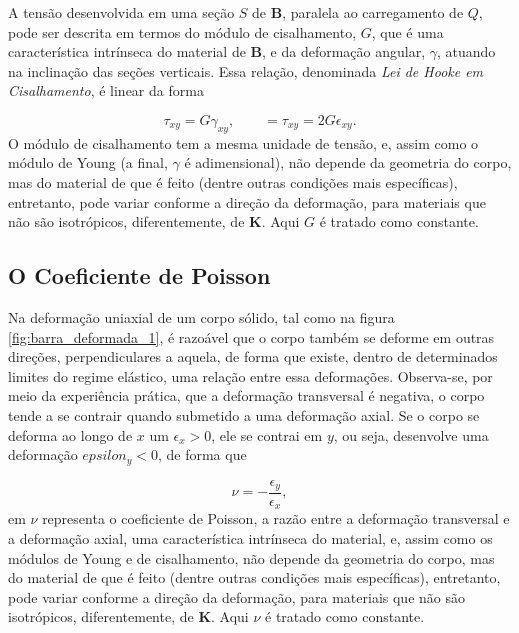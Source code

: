 A tensão desenvolvida em uma seção $S$ de $\bm{B}$, paralela ao carregamento de  $Q$, pode ser descrita em termos do módulo de cisalhamento, $G$, que é uma característica intrínseca do material de $\bm{B}$, e da deformação angular, $\gamma$, atuando na inclinação das seções verticais. Essa relação, denominada \emph{Lei de Hooke em Cisalhamento}, é linear da forma

\begin{equation}
    \tau_{xy} = G \gamma_{xy}, \qquad = \tau_{xy} = 2G \epsilon_{xy}.
    \label{eq:lei_de_hooke_cisalhamento}
\end{equation}
O módulo de cisalhamento tem a mesma unidade de tensão, e, assim como o módulo de Young (a final, $\gamma$ é adimensional), não depende da geometria do corpo, mas do material de que é feito (dentre outras condições mais específicas), entretanto, pode variar conforme a direção da deformação, para materiais que não são isotrópicos, diferentemente, de $\bm{K}$. Aqui $G$ é tratado como constante.

\subsection{O Coeficiente de Poisson}

Na deformação uniaxial de um corpo sólido, tal como na figura \ref{fig:barra_deformada_1}, é razoável que o corpo também se deforme em outras direções, perpendiculares a aquela, de forma que existe, dentro de determinados limites do regime elástico, uma relação entre essa deformações. Observa-se, por meio da experiência prática, que a deformação transversal é negativa, o corpo tende a se contrair quando submetido a uma deformação axial. Se o corpo se deforma ao longo de $x$ um $\epsilon_x > 0$, ele se contrai em $y$, ou seja, desenvolve uma deformação $epsilon_y < 0$, de forma que \cite{lub}

\begin{equation}
    \nu = -\frac{\epsilon_y}{\epsilon_x},
    \label{eq:coeficiente_de_poisson}
\end{equation}
em $\nu$ representa o coeficiente de Poisson, a razão entre a deformação transversal e a deformação axial, uma característica intrínseca do material, e, assim como os módulos de Young e de cisalhamento, não depende da geometria do corpo, mas do material de que é feito (dentre outras condições mais específicas), entretanto, pode variar conforme a direção da deformação, para materiais que não são isotrópicos, diferentemente, de $\bm{K}$. Aqui $\nu$ é tratado como constante.

